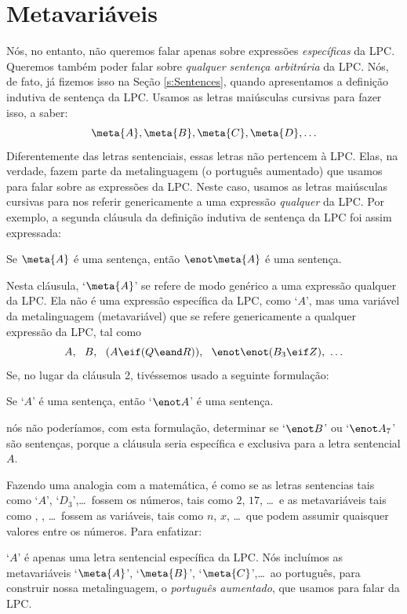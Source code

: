 \section{Metavariáveis}\label{s:Metavariables}
Nós, no entanto, não queremos falar apenas sobre expressões \emph{específicas} da LPC. 
Queremos também poder falar sobre \emph{qualquer sentença arbitrária} da LPC.
Nós, de fato, já fizemos isso na Seção \ref{s:Sentences}, quando apresentamos a definição indutiva de sentença da LPC.
Usamos as letras maiúsculas cursivas para fazer isso, a saber:
	$$\meta{A}, \meta{B}, \meta{C}, \meta{D}, \ldots$$
Diferentemente das letras sentenciais, essas letras não pertencem à LPC.
Elas, na verdade, fazem parte da metalinguagem (o português aumentado) que usamos para falar sobre as expressões da LPC.
Neste caso, usamos as letras maiúsculas cursivas para nos referir genericamente a uma expressão \emph{qualquer} da LPC.
Por exemplo, a segunda cláusula da definição indutiva de sentença da LPC foi assim expressada:
	\begin{earg}
		\item[2.] Se $\meta{A}$ é uma sentença, então $\enot \meta{A}$ é uma sentença.
	\end{earg}
Nesta cláusula, `$\meta{A}$' se refere de modo genérico a uma expressão qualquer da LPC.
Ela não é uma expressão específica da LPC, como `$A$', mas uma variável da metalinguagem (metavariável) que se refere genericamente a qualquer expressão da LPC, tal como $$A,\ \ B,\ \  (A \eif (Q \eand R)),\ \  \enot\enot(B_3 \eif Z),\ \ldots$$
Se, no lugar da cláusula 2, tivéssemos usado a seguinte formulação:
	\begin{ebullet}
		\item Se `$A$' é uma sentença, então `$\enot A$' é uma sentença.
	\end{ebullet}
nós não poderíamos, com esta formulação, determinar se `$\enot B$' ou `$\enot A_7$' são sentenças, porque a cláusula seria específica e exclusiva para a letra sentencial $A$.

Fazendo uma analogia com a matemática, é como se as letras sentencias tais como `$A$', `$D_3$',\ldots\ fossem os números, tais como $2$, $17$, \ldots\ e as metavariáveis tais como , , \ldots\ fossem as variáveis, tais como $n$, $x$, \ldots\ que podem assumir quaisquer valores entre os números.
Para enfatizar:

`$A$' é apenas uma letra sentencial específica da LPC.
Nós incluímos as metavariáveis `$\meta{A}$', `$\meta{B}$', `$\meta{C}$',\ldots\ ao português, para construir nossa metalinguagem, o \emph{português aumentado}, que usamos para falar da LPC.


